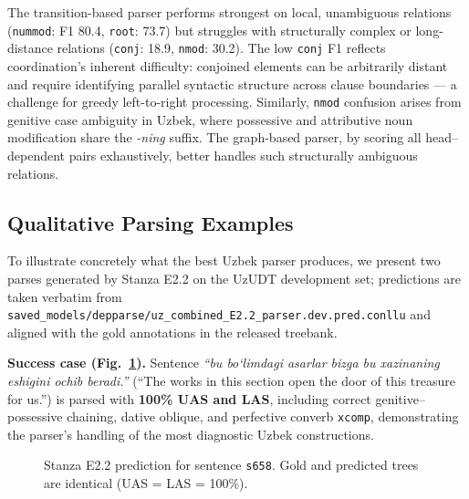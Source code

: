 \documentclass[10pt,conference,a4paper]{IEEEtran_EDM}
\begin{document}
The transition-based parser performs strongest on local, unambiguous relations (\texttt{nummod}: F1 80.4, \texttt{root}: 73.7) but struggles with structurally complex or long-distance relations (\texttt{conj}: 18.9, \texttt{nmod}: 30.2). The low \texttt{conj} F1 reflects coordination's inherent difficulty: conjoined elements can be arbitrarily distant and require identifying parallel syntactic structure across clause boundaries --- a challenge for greedy left-to-right processing. Similarly, \texttt{nmod} confusion arises from genitive case ambiguity in Uzbek, where possessive and attributive noun modification share the \textit{-ning} suffix. The graph-based parser, by scoring all head--dependent pairs exhaustively, better handles such structurally ambiguous relations.

\subsection{Qualitative Parsing Examples}
\label{sec:qualitative}

To illustrate concretely what the best Uzbek parser produces, we present two parses generated by Stanza E2.2 on the UzUDT development set; predictions are taken verbatim from \texttt{saved\_models/depparse/uz\_combined\_E2.2\_parser.dev.pred.conllu} and aligned with the gold annotations in the released treebank.

\textbf{Success case (Fig.~\ref{fig:parse_success}).} Sentence \textit{``bu bo\textquoteleft{}limdagi asarlar bizga bu xazinaning eshigini ochib beradi.''} (``The works in this section open the door of this treasure for us.'') is parsed with \textbf{100\% UAS and LAS}, including correct genitive--possessive chaining, dative oblique, and perfective converb \texttt{xcomp}, demonstrating the parser's handling of the most diagnostic Uzbek constructions.

\begin{figure}[htbp]
\centering
{}
\caption{Stanza E2.2 prediction for sentence \texttt{s658}. Gold and predicted trees are identical (UAS = LAS = 100\%).}
\label{fig:parse_success}
\end{figure}
\end{document}
